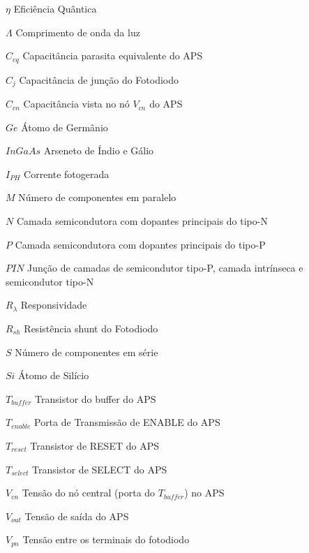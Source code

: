 \begin{simbolos}
  \item[$ \eta $] Eficiência Quântica
  \item[$ \Lambda $] Comprimento de onda da luz
  \item[$ C_{eq}$ ] Capacitância parasita equivalente do APS
  \item[$ C_j $] Capacitância de junção do Fotodiodo
  \item[$ C_{cn}$] Capacitância vista no nó $V_{cn}$ do APS
  \item[$ Ge $] Átomo de Germânio
  \item[$ InGaAs $] Arseneto de Índio e Gálio
  \item[$ I_{PH} $] Corrente fotogerada
  \item[$ M $] Número de componentes em paralelo
  \item[$ N $] Camada semicondutora com dopantes principais do tipo-N
  \item[$ P $] Camada semicondutora com dopantes principais do tipo-P
  \item[$ PIN $] Junção de camadas de semicondutor tipo-P, camada intrínseca e semicondutor tipo-N
  \item[$ R_\lambda $] Responsividade
  \item[$ R_{sh} $] Resistência shunt do Fotodiodo
  \item[$ S $] Número de componentes em série
  \item[$ Si $] Átomo de Silício
  \item[$ T_{buffer} $] Transistor do buffer do APS
  \item[$ T_{enable} $] Porta de Transmissão de ENABLE do APS
  \item[$ T_{reset} $] Transistor de RESET do APS
  \item[$ T_{select} $] Transistor de SELECT do APS
  
  
  \item[$ V_{cn} $] Tensão do nó central (porta do $T_{buffer}$) no APS
  \item[$ V_{out} $] Tensão de saída do APS
  \item[$V_{pn}$] Tensão entre os terminais do fotodiodo
  
\end{simbolos}
